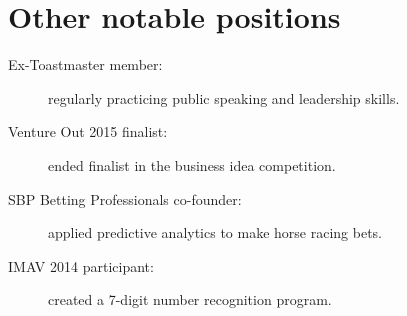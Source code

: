 \documentclass[10pt]{CurriculumVitae}
\begin{document}
  \section{Other notable positions}
    \begin{description}
      \item[Ex-Toastmaster member:] regularly practicing public speaking and leadership skills.
      \item[Venture Out 2015 finalist:] ended finalist in the business idea competition.
      \item[SBP Betting Professionals co-founder:] applied predictive analytics to make horse racing bets.
      \item[IMAV 2014 participant:] created a 7-digit number recognition program.
    \end{description}
\end{document}
